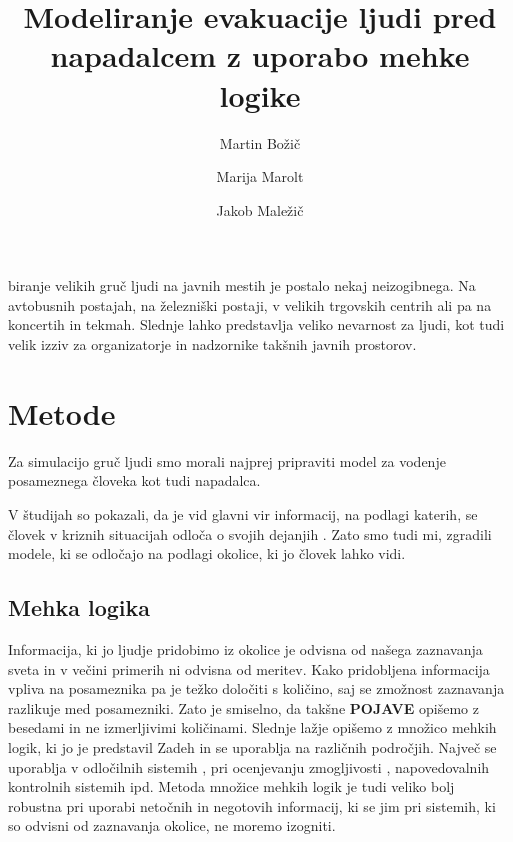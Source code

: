 \documentclass[9pt]{pnas-new}
\title{Modeliranje evakuacije ljudi pred napadalcem z uporabo mehke logike}
\author{Martin Božič}
\author{Marija Marolt}
\author{Jakob Maležič}
\affil{Poročilo seminarske naloge pri predmetu Skupinsko vedenje}
\begin{document}
\verticaladjustment{-2pt}

\maketitle
\thispagestyle{firststyle}

biranje velikih gruč ljudi na javnih mestih je postalo nekaj neizogibnega. Na avtobusnih postajah, na železniški postaji, v velikih trgovskih centrih ali pa na koncertih in tekmah. Slednje lahko predstavlja veliko nevarnost za ljudi, kot tudi velik izziv za organizatorje in nadzornike takšnih javnih prostorov.

\section*{Metode}
Za simulacijo gruč ljudi smo morali najprej pripraviti model za vodenje posameznega človeka kot tudi napadalca.

V študijah so pokazali, da je vid glavni vir informacij, na podlagi katerih, se človek v kriznih situacijah odloča o svojih dejanjih \cite{brcdp2018, mht2011}. Zato smo tudi mi, zgradili modele, ki se odločajo na podlagi okolice, ki jo človek lahko vidi.

\subsection*{Mehka logika}
\label{mehka_logika}
Informacija, ki jo ljudje pridobimo iz okolice je odvisna od našega zaznavanja sveta in v večini primerih ni odvisna od meritev. Kako pridobljena informacija vpliva na posameznika pa je težko določiti s količino, saj se zmožnost zaznavanja razlikuje med posamezniki. Zato je smiselno, da takšne \textbf{POJAVE} opišemo z besedami in ne izmerljivimi količinami. Slednje lažje opišemo z množico mehkih logik, ki jo je predstavil Zadeh \cite{ZADEH1965338} in se uporablja na različnih področjih. Največ se uporablja v odločilnih sistemih \cite{Dong2013}, pri ocenjevanju zmogljivosti \cite{HWWDGHJZN1969}, napovedovalnih kontrolnih sistemih \cite{en10060794} ipd. Metoda množice mehkih logik je tudi veliko bolj robustna pri uporabi netočnih in negotovih informacij, ki se jim pri sistemih, ki so odvisni od zaznavanja okolice, ne moremo izogniti.
\end{document}
